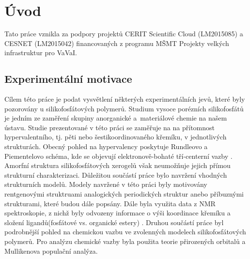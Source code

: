 \documentclass[
  digital, %
  table,   %
  lof,     %
  lot,     %
  oneside,
]{fithesis3}
\begin{document}
\chapter{Úvod}
 Tato práce vznikla za podpory projektů CERIT Scientific Cloud (LM2015085) a CESNET (LM2015042) financovaných z programu MŠMT Projekty velkých infrastruktur pro VaVaI.

\section{Experimentální motivace}
Cílem této práce je podat vysvětlení některých experimentálních jevů, které byly pozorovány u silikofosfátových polymerů. Studium vysoce porézních silikofosfátů je jedním ze zaměření skupiny anorganické a~materiálové chemie na našem ústavu. Studie prezentované v této práci se zaměřuje na na přítomnost hypervalentního, tj. pěti nebo šestikoordinovaného křemíku, v jednotlivých strukturách. Obecný pohled na hypervalency poskytuje Rundleovo a Piementelovo schéma, kde se objevují elektronově-bohaté tří-centerní vazby \cite{405827} \cite{Munzarova2001}. \\
Amorfní struktura silikofosfátových xerogelů však neumožňuje jejich přímou strukturní charakterizaci. Důležitou součástí práce bylo navržení vhodných strukturních modelů. Modely navržené v této práci byly motivovány rentgenovými struktruami analogických periodických struktur \cite{C3NJ00721A} \cite{C4TA06823H} anebo příbuznými strukturami, které budou dále popsány. Dále byla využita data z NMR spektroskopie, z nichž byly odvozeny informace o výši koordinace křemíku a složení ligandů(fosfátové vs. organické estery) \cite{Styskalik2015thesis}. Druhou součástí práce byl podrobnější pohled na chemickou vazbu ve zvolenných modelech silikofosfátových polymerů. Pro analýzu chemické vazby byla použita teorie přirozených orbitalů a Mullikenova populační analýza.
\end{document}
